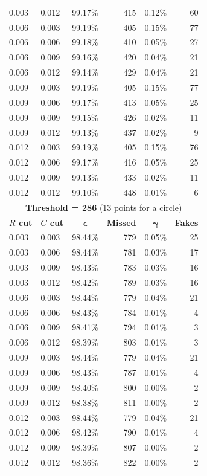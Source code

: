 \documentclass[11pt,twoside]{scrreprt}
\begin{document}
\begin{longtable}{llcrcr}
0.003 & 0.012 & 99.17\% & 415 & 0.12\% & 60 \\
0.006 & 0.003 & 99.19\% & 405 & 0.15\% & 77 \\
0.006 & 0.006 & 99.18\% & 410 & 0.05\% & 27 \\
0.006 & 0.009 & 99.16\% & 420 & 0.04\% & 21 \\
0.006 & 0.012 & 99.14\% & 429 & 0.04\% & 21 \\
0.009 & 0.003 & 99.19\% & 405 & 0.15\% & 77 \\
0.009 & 0.006 & 99.17\% & 413 & 0.05\% & 25 \\
0.009 & 0.009 & 99.15\% & 426 & 0.02\% & 11 \\
0.009 & 0.012 & 99.13\% & 437 & 0.02\% & 9 \\
0.012 & 0.003 & 99.19\% & 405 & 0.15\% & 76 \\
0.012 & 0.006 & 99.17\% & 416 & 0.05\% & 25 \\
0.012 & 0.009 & 99.13\% & 433 & 0.02\% & 11 \\
0.012 & 0.012 & 99.10\% & 448 & 0.01\% & 6 \\
\bottomrule
\toprule
\multicolumn{6}{c}{\textbf{Threshold = 286} (13 points for a circle)}\\
\midrule
\textbf{$R$ cut} & \textbf{$C$ cut} & $\boldsymbol{\epsilon}$ & \textbf{Missed} & $\boldsymbol{\gamma}$ & \textbf{Fakes} \\
\midrule
0.003 & 0.003 & 98.44\% & 779 & 0.05\% & 25 \\
0.003 & 0.006 & 98.44\% & 781 & 0.03\% & 17 \\
0.003 & 0.009 & 98.43\% & 783 & 0.03\% & 16 \\
0.003 & 0.012 & 98.42\% & 789 & 0.03\% & 16 \\
0.006 & 0.003 & 98.44\% & 779 & 0.04\% & 21 \\
0.006 & 0.006 & 98.43\% & 784 & 0.01\% & 4 \\
0.006 & 0.009 & 98.41\% & 794 & 0.01\% & 3 \\
0.006 & 0.012 & 98.39\% & 803 & 0.01\% & 3 \\
0.009 & 0.003 & 98.44\% & 779 & 0.04\% & 21 \\
0.009 & 0.006 & 98.43\% & 787 & 0.01\% & 4 \\
0.009 & 0.009 & 98.40\% & 800 & 0.00\% & 2 \\
0.009 & 0.012 & 98.38\% & 811 & 0.00\% & 2 \\
0.012 & 0.003 & 98.44\% & 779 & 0.04\% & 21 \\
0.012 & 0.006 & 98.42\% & 790 & 0.01\% & 4 \\
0.012 & 0.009 & 98.39\% & 807 & 0.00\% & 2 \\
0.012 & 0.012 & 98.36\% & 822 & 0.00\% & 2 \\
\bottomrule
\end{longtable}
\end{document}
